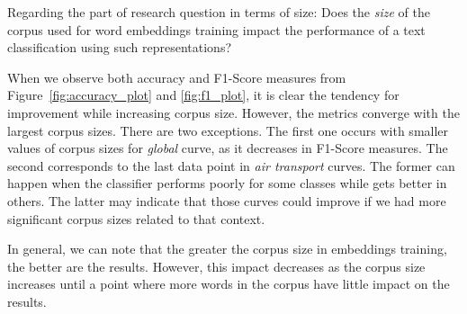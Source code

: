 
Regarding the part of research question in terms of size: 
Does the \textit{size}  of the corpus used for word embeddings training impact the performance of a text classification using such representations? 

When we observe both accuracy and F1-Score measures from Figure~\ref{fig:accuracy_plot} and \ref{fig:f1_plot}, it is clear the tendency for improvement while increasing corpus size. However, the metrics converge with the largest corpus sizes. There are two exceptions. The first one occurs with smaller values of corpus sizes for \textit{global} curve, as it decreases in F1-Score measures. The second corresponds to the last data point in \textit{air transport} curves. The former can happen when the classifier performs poorly for some classes while gets better in others. The latter may indicate that those curves could improve if we had more significant corpus sizes related to that context.

In general, we can note that the greater the corpus size in embeddings training, the better are the results. However, this impact decreases as the corpus size increases until a point where more words in the corpus have little impact on the results.

